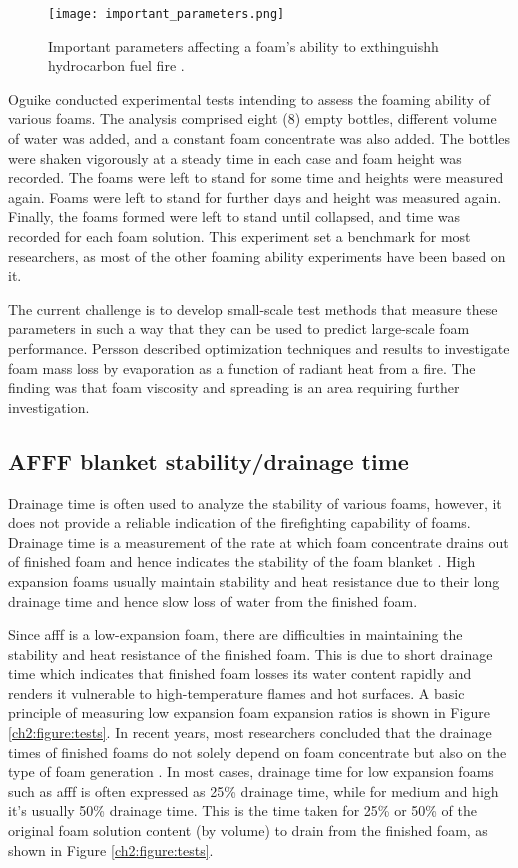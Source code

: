 \begin{figure}[H]
    \centering
    \texttt{[image: important\_parameters.png]}
    \caption{Important parameters affecting a foam's ability to exthinguishh hydrocarbon fuel fire \cite{scheffey1995evaluating}.}
    \label{ch2:figure:parameters}
\end{figure}

Oguike \cite{oguike2013study} conducted experimental tests intending to assess the foaming ability of various foams. The analysis comprised eight (8) empty bottles, different volume of water was added, and a constant foam concentrate was also added. The bottles were shaken vigorously at a steady time in each case and foam height was recorded. The foams were left to stand for some time and heights were measured again. Foams were left to stand for further days and height was measured again. Finally, the foams formed were left to stand until collapsed, and time was recorded for each foam solution. This experiment set a benchmark for most researchers, as most of the other foaming ability experiments have been based on it. 

The current challenge is to develop small-scale test methods that measure these parameters in such a way that they can be used to predict large-scale foam performance. Persson \cite{persson1992fire} described optimization techniques and results to investigate foam mass loss by evaporation as a function of radiant heat from a fire. The finding was that foam viscosity and spreading is an area requiring further investigation.

\subsection{AFFF blanket stability/drainage time}
Drainage time is often used to analyze the stability of various foams, however, it does not provide a reliable indication of the firefighting capability of foams. Drainage time is a measurement of the rate at which foam concentrate drains out of finished foam and hence indicates the stability of the foam blanket \cite{aamodt2020review}. High expansion foams usually maintain stability and heat resistance due to their long drainage time and hence slow loss of water from the finished foam.  

Since \acrshort{afff} is a low-expansion foam, there are difficulties in maintaining the stability and heat resistance of the finished foam. This is due to short drainage time which indicates that finished foam losses its water content rapidly and renders it vulnerable to high-temperature flames and hot surfaces. A basic principle of measuring low expansion foam expansion ratios is shown in Figure \ref{ch2:figure:tests}. In recent years, most researchers concluded that the drainage times of finished foams do not solely depend on foam concentrate but also on the type of foam generation \cite{martin2012fire}. In most cases, drainage time for low expansion foams such as \acrshort{afff} is often expressed as 25\% drainage time, while for medium and high it’s usually 50\% drainage time. This is the time taken for 25\% or 50\% of the original foam solution content (by volume) to drain from the finished foam, as shown in Figure \ref{ch2:figure:tests}.

